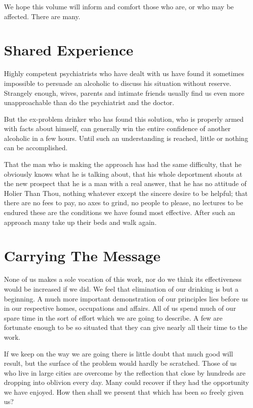 We hope this volume will inform and comfort those who are, or who may be affected. 
There are many.


\section{Shared Experience}

Highly competent psychiatrists who have dealt with us have found it sometimes impossible to persuade an alcoholic to discuss his situation without reserve. 
Strangely enough, wives, parents and intimate friends usually find us even more unapproachable than do the psychiatrist and the doctor.

But the ex-problem drinker who has found this solution, who is properly armed with facts about himself, 
can generally win the entire confidence of another alcoholic in a few hours. 
Until such an understanding is reached, little or nothing can be accomplished.

That the man who is making the approach has had the same difficulty, that he obviously knows what he is talking about, 
that his whole deportment shouts at the new prospect that he is a man with a real answer, 
that he has no attitude of Holier Than Thou, nothing whatever except the sincere desire to be helpful; 
that there are no fees to pay, no axes to grind, no people to please, no lectures to be endured 
these are the conditions we have found most effective. 
After such an approach many take up their beds and walk again.


\section{Carrying The Message}

None of us makes a sole vocation of this work, 
nor do we think its effectiveness would be increased if we did. 
We feel that elimination of our drinking is but a beginning. 
A much more important demonstration of our principles lies before us in our respective homes, occupations and affairs. 
All of us spend much of our spare time in the sort of effort which we are going to describe. 
A few are fortunate enough to be so situated that they can give nearly all their time to the work.

If we keep on the way we are going there is little doubt that much good will result, 
but the surface of the problem would hardly be scratched. 
Those of us who live in large cities are overcome by the reflection that close by hundreds are dropping into oblivion every day. 
Many could recover if they had the opportunity we have enjoyed. 
How then shall we present that which has been so freely given us?

